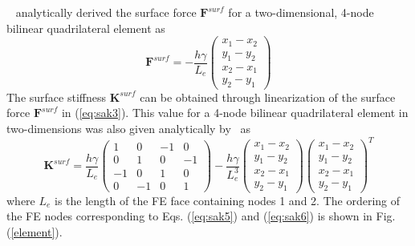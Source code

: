 \documentclass[final,authoryear,3p,times,twocolumn]{elsarticle}
\newcommand{\mbf}{\mathbf}
\begin{document}
~\citet{henannSM2014} analytically derived the surface force $\mbf{F}^{surf}$ for a two-dimensional, 4-node bilinear quadrilateral element as
\begin{equation}\label{eq:sak5} \mbf{F}^{surf}=-\frac{h\gamma}{L_{e}}\left(\begin{array}{cccc} {x_{1}-x_{2}} \\ {y_{1}-y_{2}} \\ {x_{2}-x_{1}} \\ {y_{2}-y_{1}} \end{array}\right)
\end{equation} 
The surface stiffness $\mbf{K}^{surf}$ can be obtained through linearization of the surface force $\mbf{F}^{surf}$ in (\ref{eq:sak3}).  This value for a 4-node bilinear quadrilateral element in two-dimensions was also given analytically by~\cite{henannSM2014} as
\begin{equation}\label{eq:sak6} \mbf{K}^{surf}=\frac{h\gamma}{L_{e}}\left(\begin{array}{cccc} {1} & {0} & {-1} & {0} \\ {0} & {1} & {0} & {-1} \\ {-1} & {0} & {1} & {0} \\ {0} & {-1} & {0} & {1} \end{array}\right)-\frac{h\gamma}{L_{e}^{3}}\left(\begin{array}{cccc} {x_{1}-x_{2}} \\ {y_{1}-y_{2}} \\ {x_{2}-x_{1}} \\ {y_{2}-y_{1}} \end{array}\right)\left(\begin{array}{cccc} {x_{1}-x_{2}} \\ {y_{1}-y_{2}} \\ {x_{2}-x_{1}} \\ {y_{2}-y_{1}} \end{array}\right)^{T}
\end{equation}
where $L_{e}$ is the length of the FE face containing nodes 1 and 2.  The ordering of the FE nodes corresponding to Eqs. (\ref{eq:sak5}) and (\ref{eq:sak6}) is shown in Fig. (\ref{element}).  
\end{document}
